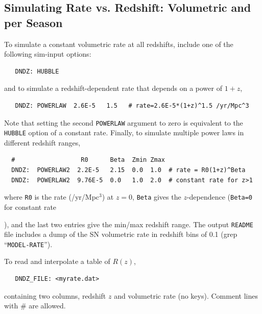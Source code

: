 \documentclass[12pt]{article}
\begin{document}
{%

   \clearpage
 \subsection{Simulating Rate vs. Redshift: Volumetric and per Season}
 \label{subsec:DNDZ}

To simulate a constant volumetric rate at all redshifts,
include one of the following sim-input options:
%
\begin{verbatim}
   DNDZ: HUBBLE
\end{verbatim}
%
and to simulate a redshift-dependent rate that depends
on a power of $1+z$,
%
\begin{verbatim}
   DNDZ: POWERLAW  2.6E-5   1.5   # rate=2.6E-5*(1+z)^1.5 /yr/Mpc^3
\end{verbatim}
%
Note that setting the second {\tt POWERLAW} argument to zero
is equivalent to the {\tt HUBBLE} option of a constant rate.
Finally, to simulate multiple power laws in different 
redshift ranges,
\begin{verbatim}
  #                  R0      Beta  Zmin Zmax
  DNDZ:  POWERLAW2  2.2E-5   2.15  0.0  1.0  # rate = R0(1+z)^Beta
  DNDZ:  POWERLAW2  9.76E-5  0.0   1.0  2.0  # constant rate for z>1
\end{verbatim}
%
where {\tt R0} is the rate (/yr/Mpc$^3$) at $z=0$,
{\tt Beta} gives the $z$-dependence ({\tt Beta=0} for constant rate}),
and the last two entries give the min/max redshift range.
The output {\tt README} file includes a dump of the 
SN volumetric rate in redshift bins of 0.1
(grep ``{\tt MODEL-RATE}'').

To read and interpolate a table of $R(z)$,
\begin{verbatim}     
   DNDZ_FILE: <myrate.dat>
\end{verbatim}
containing two columns, redshift $z$ and volumetric rate (no keys).
Comment lines with \# are allowed.
\end{document}
